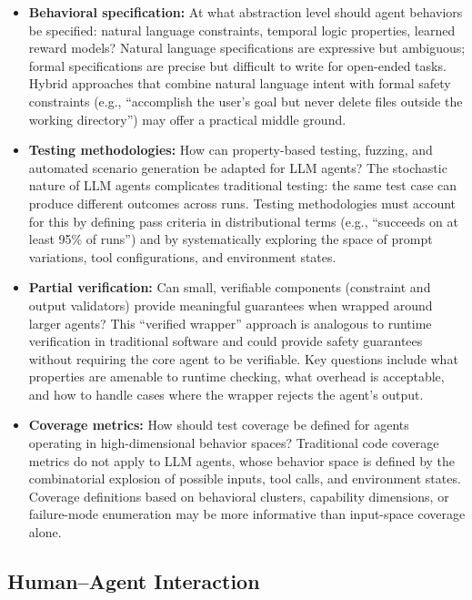 \documentclass[11pt]{article}
\newcounter{dimension}
\begin{document}
\begin{itemize}[leftmargin=*]
    \item \textbf{Behavioral specification:} At what abstraction level should agent behaviors be specified: natural language constraints, temporal logic properties, learned reward models?
    Natural language specifications are expressive but ambiguous; formal specifications are precise but difficult to write for open-ended tasks.
    Hybrid approaches that combine natural language intent with formal safety constraints (e.g., ``accomplish the user's goal but never delete files outside the working directory'') may offer a practical middle ground.

    \item \textbf{Testing methodologies:} How can property-based testing, fuzzing, and automated scenario generation be adapted for LLM agents?
    The stochastic nature of LLM agents complicates traditional testing: the same test case can produce different outcomes across runs.
    Testing methodologies must account for this by defining pass criteria in distributional terms (e.g., ``succeeds on at least 95\% of runs'') and by systematically exploring the space of prompt variations, tool configurations, and environment states.

    \item \textbf{Partial verification:} Can small, verifiable components (constraint and output validators) provide meaningful guarantees when wrapped around larger agents?
    This ``verified wrapper'' approach is analogous to runtime verification in traditional software and could provide safety guarantees without requiring the core agent to be verifiable.
    Key questions include what properties are amenable to runtime checking, what overhead is acceptable, and how to handle cases where the wrapper rejects the agent's output.

    \item \textbf{Coverage metrics:} How should test coverage be defined for agents operating in high-dimensional behavior spaces?
    Traditional code coverage metrics do not apply to LLM agents, whose behavior space is defined by the combinatorial explosion of possible inputs, tool calls, and environment states.
    Coverage definitions based on behavioral clusters, capability dimensions, or failure-mode enumeration may be more informative than input-space coverage alone.
\end{itemize}

\subsection{Human--Agent Interaction}
\end{document}
